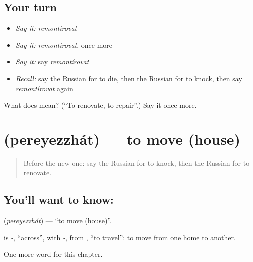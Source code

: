 \subsection*{Your turn}
\begin{itemize}
\raggedright
  \item \emph{Say it:} \emph{remontírovat}
  \item \emph{Say it:} \emph{remontírovat}, once more
  \item \emph{Say it:} say \emph{remontírovat}
  \item \emph{Recall:} say the Russian for to die, then the Russian for to knock, then say \emph{remontírovat} again
\end{itemize}

\begin{tcolorbox}[breakable,colback=teal!4,colframe=teal!35!black,title={Before you move on}]
What does  mean? (\textquotedblleft{}To renovate, to repair\textquotedblright{}.) Say it once more.
\end{tcolorbox}
\section[\texorpdfstring{\ru{переезжать} (pereyezzhát)}{переезжать (pereyezzhát)}]{ (pereyezzhát) — to move (house)}

\label{lesson:RU-C237-pereyezzhat}



\begin{quote}
Before the new one: say the Russian for to knock, then the Russian for to renovate.
\end{quote}

\subsection*{You'll want to know: }
\textbf{} (\emph{pereyezzhát}) — \textquotedblleft{}to move (house)\textquotedblright{}.

\begin{cousinweb}
\textbf{} is \emph{-}, \textquotedblleft{}across\textquotedblright{}, with \emph{-}, from \emph{}, \textquotedblleft{}to travel\textquotedblright{}: to move from one home to another.
\end{cousinweb}

\begin{grammarlens}[title={What you've built}]
One more word for this chapter.
\end{grammarlens}

